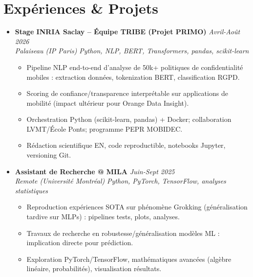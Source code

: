\documentclass[a4paper,11pt]{article}
\begin{document}
\section{Exp\'eriences \& Projets}
\begin{itemize}[leftmargin=*, label=\tiny$\bullet$, nosep]
    \item \textbf{Stage INRIA Saclay -- \'Equipe TRIBE (Projet PRIMO)} \hfill \textit{Avril-Ao\^ut 2026} \\
    \textit{Palaiseau (IP Paris)} \hfill \textit{Python, NLP, BERT, Transformers, pandas, scikit-learn}
    \vspace{-2pt}
    \begin{itemize}[leftmargin=0.4cm, nosep, label=\tiny$\bullet$]
        \item \small{Pipeline NLP end-to-end d'analyse de 50k+ politiques de confidentialit\'e mobiles : extraction donn\'ees, tokenization BERT, classification RGPD.}
        \item \small{Scoring de confiance/transparence interpr\'etable sur applications de mobilit\'e (impact ult\'erieur pour Orange Data Insight).}
        \item \small{Orchestration Python (scikit-learn, pandas) + Docker; collaboration LVMT/\'Ecole Ponts; programme PEPR MOBIDEC.}
        \item \small{R\'edaction scientifique EN, code reproductible, notebooks Jupyter, versioning Git.}
    \end{itemize}
    \vspace{3pt}

    \item \textbf{Assistant de Recherche @ MILA} \hfill \textit{Juin-Sept 2025} \\
    \textit{Remote (Universit\'e Montr\'eal)} \hfill \textit{Python, PyTorch, TensorFlow, analyses statistiques}
    \vspace{-2pt}
    \begin{itemize}[leftmargin=0.4cm, nosep, label=\tiny$\bullet$]
        \item \small{Reproduction exp\'eriences SOTA sur ph\'enom\`ene Grokking (g\'en\'eralisation tardive sur MLPs) : pipelines tests, plots, analyses.}
        \item \small{Travaux de recherche en robustesse/g\'en\'eralisation mod\`eles ML : implication directe pour pr\'ediction.}
        \item \small{Exploration PyTorch/TensorFlow, math\'ematiques avanc\'ees (alg\`ebre lin\'eaire, probabilit\'es), visualisation r\'esultats.}
    \end{itemize}
    \vspace{3pt}


\end{itemize}
\end{document}
